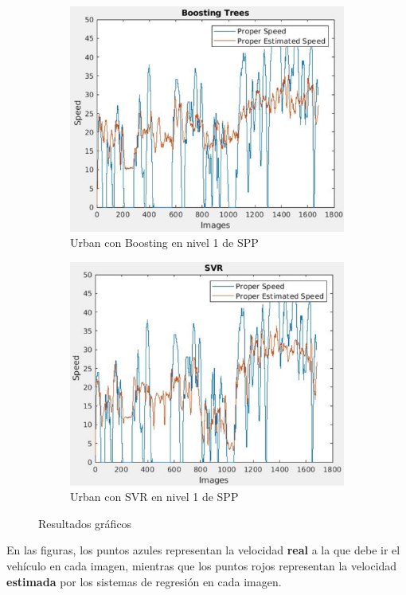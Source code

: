 \begin{figure}[H]
\begin{subfigure}[b]{0.45\linewidth}
    \includegraphics[width=\linewidth]{Figuras/Boosting_Urban(Nivel_1).eps}
    \caption{Urban con Boosting en nivel 1 de \ac{SPP}}
  \end{subfigure}
      \begin{subfigure}[b]{0.45\linewidth}
    \includegraphics[width=\linewidth]{Figuras/SVR_Urban(Nivel_1).eps}
    \caption{Urban con SVR en nivel 1 de \ac{SPP}}
  \end{subfigure}
  \caption{Resultados gráficos}
\end{figure}

En las figuras, los puntos azules representan la velocidad \textbf{real} a la que debe ir el vehículo en cada imagen, mientras que los puntos rojos representan la velocidad \textbf{estimada} por los sistemas de regresión en cada imagen.

